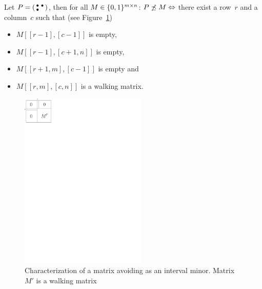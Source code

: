 \begin{thm}
\label{theorem1}
Let $P=\left(\begin{smallmatrix}\bullet&\bullet\\\bullet& \end{smallmatrix}\right)$, then for all $M\in\{0,1\}^{m\times n}$: $P\not\preceq M\Leftrightarrow$ there exist a row~$r$ and a column~$c$ such that (see Figure~\ref{p12})
\begin{itemize}
\item $M[[r-1],[c-1]]$ is empty,
\item $M[[r-1],[c+1,n]]$ is empty,
\item $M[[r+1,m],[c-1]]$ is empty and
\item $M[[r,m],[c,n]]$ is a walking matrix.
\end{itemize}
\end{thm}
\begin{figure}[!ht]
\centering
\includegraphics[width=60mm]{img/p12.pdf}
\caption{Characterization of a matrix avoiding \usebox{\smlmat} as an interval minor. Matrix $M'$ is a walking matrix}
\label{p12}
\end{figure}

